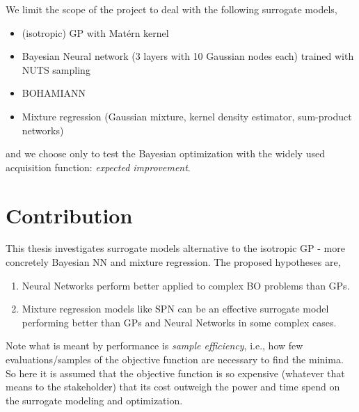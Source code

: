 We limit the scope of the project to deal with the following surrogate models, 
\begin{itemize}[noitemsep]
    \item (isotropic) GP with Matérn kernel
    \item Bayesian Neural network (3 layers with 10 Gaussian nodes each) trained with NUTS sampling
    \item BOHAMIANN
    \item Mixture regression (Gaussian mixture, kernel density estimator, sum-product networks)
\end{itemize}
and we choose only to test the Bayesian optimization with the widely used acquisition
function: \textit{expected improvement}. 


\section{Contribution}
This thesis investigates surrogate models alternative to the isotropic GP - more concretely Bayesian NN
and mixture regression. The proposed hypotheses are,
\begin{enumerate}
    \item Neural Networks perform better applied to complex BO problems than GPs.
    \item Mixture regression models like SPN can be an effective surrogate model
    performing better than GPs and Neural Networks in some complex cases. 
\end{enumerate}

Note what is meant by performance is \textit{sample efficiency}, i.e., how few evaluations/samples
of the objective function are necessary to find the minima. So here it is assumed that the objective
function is so expensive (whatever that means to the stakeholder) that its cost outweigh the power
and time spend on the surrogate modeling and optimization.


    

